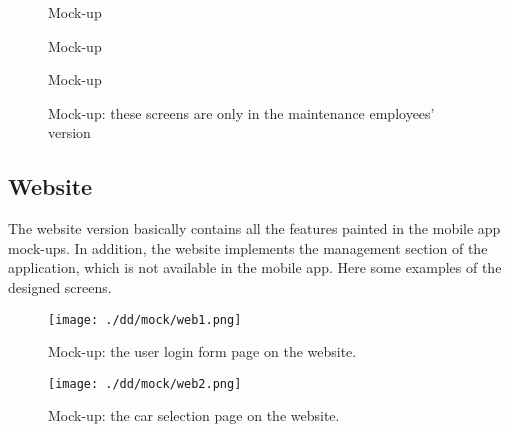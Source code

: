 \documentclass{scrreprt}
\begin{document}
\begin{figure}[htb]
\centering
{} \quad
{}
\caption{Mock-up }
\label{fig:unlockMU}
\end{figure}

\begin{figure}[htb]
\centering
{} \quad
{}
\caption{Mock-up }
\label{fig:statusMU}
\end{figure}

\begin{figure}[htb]
\centering
{} \quad
{}
\caption{Mock-up}
\label{fig:keepMU}
\end{figure}

\begin{figure}[htb]
\centering
{} \quad
{}
\caption{Mock-up: these screens are only in the maintenance employees' version}
\label{fig:reglogMU}
\end{figure}

\subsection{Website}
The website version basically contains all the features painted in the mobile app mock-ups. In addition, the website implements the management section of the application, which is not available in the mobile app. Here some examples of the designed screens.

\begin{figure}[htb]
\centering
		\texttt{[image: ./dd/mock/web1.png]}
		\caption{Mock-up: the user login form page on the website.}
		\label{web1MU}
\end{figure}

\begin{figure}[htb]
\centering
		\texttt{[image: ./dd/mock/web2.png]}
		\caption{Mock-up: the car selection page on the website.}
		\label{web2MU}
\end{figure}
\end{document}

